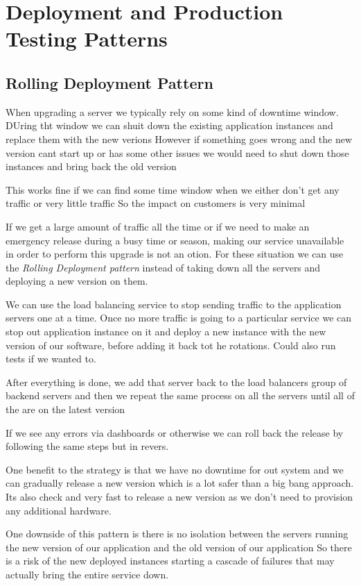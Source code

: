 \documentclass[a4paper, 11pt]{book}
\begin{document}
{    \section{Deployment and Production Testing Patterns}

    \subsection{Rolling Deployment Pattern}
    When upgrading a server we typically rely on some kind of downtime window.
    DUring tht window we can shuit down the existing application instances and replace them with the new verions
    However if something goes wrong and the new version cant start up or has some other issues we would need to shut down those instances and bring back the old version

    This works fine if we can find some time window when we either don't get any traffic or very little traffic
    So the impact on customers is very minimal

    If we get a large amount of traffic all the time or if we need to make an emergency release during a busy time or season, making our service unavailable in order to perform this upgrade is not an otion.
    For these situation we can use the \textit{Rolling Deployment pattern} instead of taking down all the servers and deploying a new version on them.

    We can use the load balancing service to stop sending traffic to the application servers one at a time.
    Once no more traffic is going to a particular service we can stop out application instance on it and deploy a new instance with the new version of our software, before adding it back tot he rotations.
    Could also run tests if we wanted to.

    After everything is done, we add that server back to the load balancers group of backend servers and then we repeat the same process on all the servers until all of the are on the latest version

    If we see any errors via dashboards or otherwise we can roll back the release by following the same steps but in revers.

    One benefit to the strategy is that we have no downtime for out system and we can gradually release a new version which is a lot safer than a big bang approach.
    Its also check and very fast to release a new version as we don't need to provision any additional hardware.

    One downside of this pattern is there is no isolation between the servers running the new version of our application and the old version of our application
    So there is a risk of the new deployed instances starting a cascade of failures that may actually bring the entire service down.


}
\end{document}
